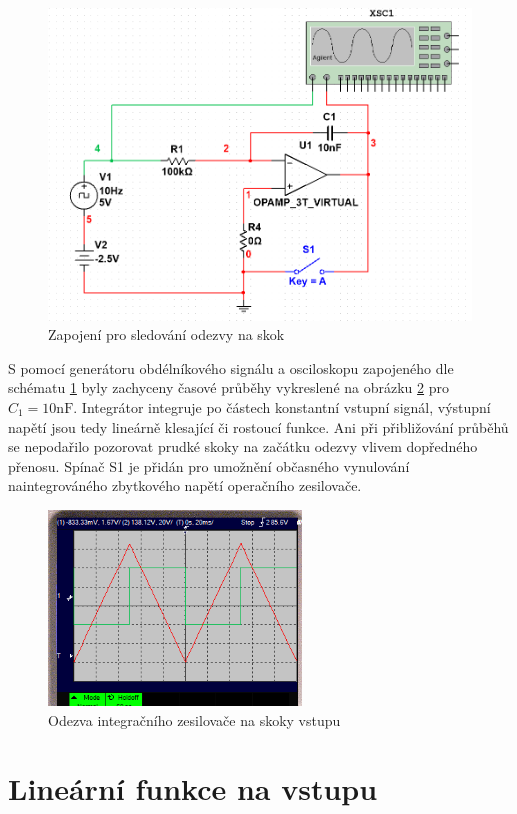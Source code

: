 \documentclass[twoside]{article}
\begin{document}
\begin{figure}[h!]
    \centering
    \includegraphics[width=0.7\linewidth]{odezva_na_skok_schema.png}
    \caption{Zapojení pro sledování odezvy na skok}
    \label{fig:skok_schema}
\end{figure}

S pomocí generátoru obdélníkového signálu a osciloskopu zapojeného dle schématu \ref{fig:skok_schema}
byly zachyceny časové průběhy vykreslené na obrázku \ref{fig:skok} pro $C_1 = 10 \si{\nano\farad}$.
Integrátor integruje po částech konstantní vstupní signál, výstupní napětí jsou tedy lineárně klesající či rostoucí funkce.
Ani při přibližování průběhů se nepodařilo pozorovat prudké skoky na začátku odezvy vlivem dopředného přenosu.
Spínač S1 je přidán pro umožnění občasného vynulování naintegrováného zbytkového napětí operačního zesilovače.

\begin{figure}[h!]
    \centering
    \includegraphics[width=0.6\textwidth]{odezva_na_skok.png}
    \caption{Odezva integračního zesilovače na skoky vstupu}
    \label{fig:skok}
\end{figure}

\newpage

\section{Lineární funkce na vstupu}
\end{document}
